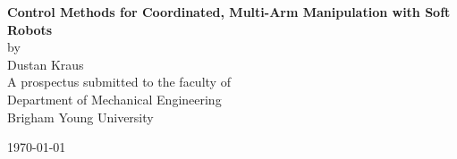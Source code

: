 \documentclass[12pt, letterpaper]{article}
\begin{document}
\begin{titlepage}

\begin{center}

\vspace*{\fill}

\vspace{0.5in}

{ \LARGE \bfseries Control Methods for Coordinated, Multi-Arm Manipulation with Soft Robots}\\[.25in]

\large
by\\[.25 in]
Dustan Kraus\\[1in]

A prospectus submitted to the faculty of\\
Department of Mechanical Engineering\\
Brigham Young University

\vspace{1in}

\today

\vspace*{\fill}

\end{center}

\end{titlepage}
\end{document}
